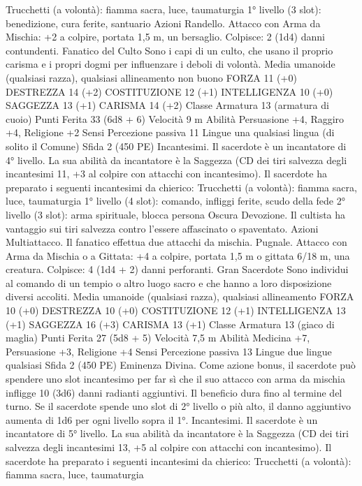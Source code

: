 \begin{multicols}{2}
Trucchetti (a volontà): fiamma sacra, luce, taumaturgia
1° livello (3 slot): benedizione, cura ferite, santuario
Azioni
Randello. Attacco con Arma da Mischia: +2 a colpire, portata
1,5 m, un bersaglio.
Colpisce: 2 (1d4) danni contundenti.
Fanatico del Culto
Sono i capi di un culto, che usano il proprio carisma e i
propri dogmi per influenzare i deboli di volontà.
Media umanoide (qualsiasi razza), qualsiasi allineamento non
buono
FORZA 11 (+0)
DESTREZZA 14 (+2)
COSTITUZIONE 12 (+1)
INTELLIGENZA 10 (+0)
SAGGEZZA 13 (+1)
CARISMA 14 (+2)
Classe Armatura 13 (armatura di cuoio)
Punti Ferita 33 (6d8 + 6)
Velocità 9 m
Abilità Persuasione +4, Raggiro +4, Religione +2
Sensi Percezione passiva 11
Lingue una qualsiasi lingua (di solito il Comune)
Sfida 2 (450 PE)
Incantesimi. Il sacerdote è un incantatore di 4° livello. La sua
abilità da incantatore è la Saggezza (CD dei tiri salvezza degli
incantesimi 11, +3 al colpire con attacchi con incantesimo). Il
sacerdote ha preparato i seguenti incantesimi da chierico:
Trucchetti (a volontà): fiamma sacra, luce, taumaturgia
1° livello (4 slot): comando, infliggi ferite, scudo della fede
2° livello (3 slot): arma spirituale, blocca persona
Oscura Devozione. Il cultista ha vantaggio sui tiri salvezza
contro l’essere affascinato o spaventato.
Azioni
Multiattacco. Il fanatico effettua due attacchi da mischia.
Pugnale. Attacco con Arma da Mischia o a Gittata: +4 a colpire,
portata 1,5 m o gittata 6/18 m, una creatura.
Colpisce: 4 (1d4 + 2) danni perforanti.
Gran Sacerdote
Sono individui al comando di un tempio o altro luogo
sacro e che hanno a loro disposizione diversi accoliti.
Media umanoide (qualsiasi razza), qualsiasi allineamento
FORZA 10 (+0)
DESTREZZA 10 (+0)
COSTITUZIONE 12 (+1)
INTELLIGENZA 13 (+1)
SAGGEZZA 16 (+3)
CARISMA 13 (+1)
Classe Armatura 13 (giaco di maglia)
Punti Ferita 27 (5d8 + 5)
Velocità 7,5 m
Abilità Medicina +7, Persuasione +3, Religione +4
Sensi Percezione passiva 13
Lingue due lingue qualsiasi
Sfida 2 (450 PE)
Eminenza Divina. Come azione bonus, il sacerdote può spendere
uno slot incantesimo per far sì che il suo attacco con arma da
mischia infligge 10 (3d6) danni radianti aggiuntivi. Il beneficio
dura fino al termine del turno. Se il sacerdote spende uno slot di
2° livello o più alto, il danno aggiuntivo aumenta di 1d6 per ogni
livello sopra il 1°.
Incantesimi. Il sacerdote è un incantatore di 5° livello. La sua
abilità da incantatore è la Saggezza (CD dei tiri salvezza degli
incantesimi 13, +5 al colpire con attacchi con incantesimo). Il
sacerdote ha preparato i seguenti incantesimi da chierico:
Trucchetti (a volontà): fiamma sacra, luce, taumaturgia

\end{multicols}
